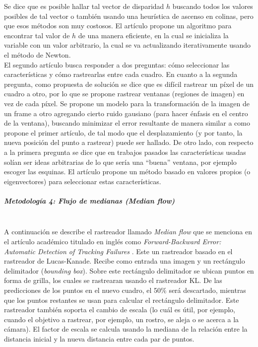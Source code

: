 \documentclass[a4paper,openright,12pt]{report}
\begin{document}
Se dice que es posible hallar tal vector de disparidad $h$ buscando todos los
valores posibles de tal vector o también usando una heurística de ascenso en
colinas, pero que esos métodos son muy costosos. El artículo propone un
algoritmo para encontrar tal valor de $h$ de una manera eficiente, en la cual
se inicializa la variable con un valor arbitrario, la cual se va actualizando
iterativamente usando el método de Newton.\\
El segundo artículo busca responder a dos preguntas: cómo seleccionar las
características y cómo rastrearlas entre cada cuadro. En cuanto a la segunda
pregunta, como propuesta de solución se dice que es difícil rastrear un píxel
de un cuadro a otro, por lo que se propone rastrear ventanas (regiones de
imagen) en vez de cada píxel. Se propone un modelo para la transformación de
la imagen de un frame a otro agregando cierto ruido gausiano (para hacer
énfasis en el centro de la ventana), buscando minimizar el error resultante de
manera similar a como propone el primer artículo, de tal modo que el
desplazamiento (y por tanto, la nueva posición del punto a rastrear) puede ser
hallado. De otro lado, con respecto a la primera pregunta se dice que en
trabajos pasados las características usadas solían ser ideas arbitrarias de lo
que sería una ``buena'' ventana, por ejemplo escoger las esquinas. El artículo
propone un método basado en valores propios (o eigenvectores) para seleccionar
estas características.\\

\subparagraph{Metodología 4: Flujo de medianas (\textit{Median flow})}
\mbox{} \\
A continuación se describe el rastreador llamado \textit{Median flow} que se
menciona en el artículo académico titulado en inglés como
\textit{Forward-Backward Error: Automatic Detection of Tracking Failures}
\cite{kalal2010forward}.
Este un rastreador basado en el rastreador de Lucas-Kanade. Recibe como
entrada una imagen y un rectángulo delimitador (\textit{bounding box}). Sobre
este rectángulo delimitador se ubican puntos en forma de grilla, los cuales se
rastrearan usando el rastreador KL. De las predicciones de los puntos en el
nuevo cuadro, el 50\% será descartado, mientras que los puntos restantes se usan
para calcular el rectángulo delimitador. Este rastreador también soporta el
cambio de escala (lo cuál es útil, por ejemplo, cuando el objetivo a rastrear,
por ejemplo, un rostro, se aleja o se acerca a la cámara). El factor de escala
se calcula usando la mediana de la relación entre la distancia inicial y la
nueva distancia entre cada par de puntos.
\end{document}
